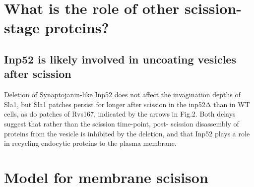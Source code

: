 \section{What is the role of other scission-stage proteins?}
\subsection{Inp52 is likely involved in uncoating vesicles after scission}
Deletion of Synaptojanin-like Inp52 does not affect the invagination depths of Sla1, but Sla1 patches persist for longer after scission in the inp52Δ than in WT cells, as do patches of Rvs167, indicated by the arrows in Fig.2. Both delays suggest that rather than the scission time-point, post- scission disassembly of proteins from the vesicle is inhibited by the deletion, and that Inp52 plays a role in recycling endocytic proteins to the plasma membrane.


\section{Model for membrane scisison}



